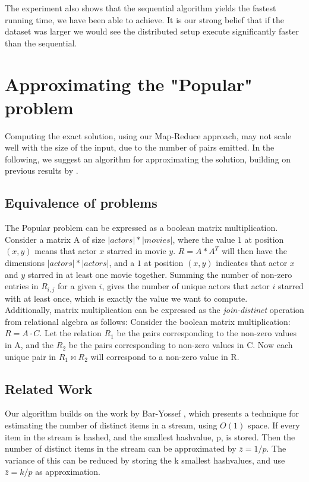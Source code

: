 \documentclass[a4paper,11pt]{article}
\begin{document}
The experiment also shows that the sequential algorithm yields the fastest running time, we have been able to achieve. 
It is our strong belief that if the dataset was larger we would see the distributed setup execute significantly faster than the sequential.

\section{Approximating the "Popular" problem}
Computing the exact solution, using our Map-Reduce approach, may not scale well with the size of the input, due to the number of pairs emitted. In the following, we suggest an algorithm for approximating the solution, building on previous results by \cite{paper:amossen}.

\subsection{Equivalence of problems}
The Popular problem can be expressed as a boolean matrix multiplication. Consider a matrix A of size $|actors|*|movies|$, where the value $1$ at position $(x, y)$ means that actor $x$ starred in movie $y$. $R = A * A^T$ will then have the dimensions $|actors|*|actors|$, and a $1$ at position $(x, y)$ indicates that actor $x$ and $y$ starred in at least one movie together. Summing the number of non-zero entries in $R_{i,j}$ for a given $i$, gives the number of unique actors that actor $i$ starred with at least once, which is exactly the value we want to compute.\\
Additionally, matrix multiplication can be expressed as the \emph{join-distinct} operation from relational algebra as follows: Consider the boolean matrix multiplication: $R = A \cdot C$. Let the relation $R_1$ be the pairs corresponding to the non-zero values in A, and the $R_2$ be the pairs corresponding to non-zero values in C. Now each unique pair in $R_1 \Join R_2$ will correspond to a non-zero value in R.

\subsection{Related Work}
Our algorithm builds on the work by Bar-Yossef \cite{paper:bar-yos}, which presents a technique for estimating the number of distinct items in a stream, using $O(1)$ space. If every item in the stream is hashed, and the smallest hashvalue, p, is stored. Then the number of distinct items in the stream can be approximated by $\bar{z}=1/p$. The variance of this can be reduced by storing the k smallest hashvalues, and use $\bar{z}=k/p$ as approximation.\\
\end{document}
